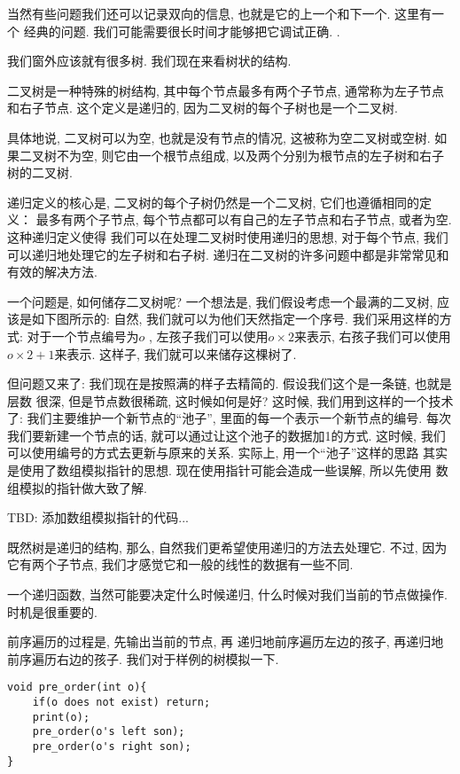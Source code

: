 
 当然有些问题我们还可以记录双向的信息, 也就是它的上一个和下一个. 这里有一个
经典的问题. 我们可能需要很长时间才能够把它调试正确. .


我们窗外应该就有很多树. 我们现在来看树状的结构. 

二叉树是一种特殊的树结构, 其中每个节点最多有两个子节点, 通常称为左子节点和右子节点. 
这个定义是递归的, 因为二叉树的每个子树也是一个二叉树. 

具体地说, 二叉树可以为空, 也就是没有节点的情况, 这被称为空二叉树或空树. 
如果二叉树不为空, 则它由一个根节点组成, 以及两个分别为根节点的左子树和右子树的二叉树. 

递归定义的核心是, 二叉树的每个子树仍然是一个二叉树, 它们也遵循相同的定义：
最多有两个子节点, 每个节点都可以有自己的左子节点和右子节点, 或者为空. 这种递归定义使得
我们可以在处理二叉树时使用递归的思想, 对于每个节点, 
我们可以递归地处理它的左子树和右子树. 递归在二叉树的许多问题中都是非常常见和有效的解决方法. 

一个问题是, 如何储存二叉树呢? 一个想法是, 我们假设考虑一个最满的二叉树, 应该是如下图所示的: 
自然, 我们就可以为他们天然指定一个序号. 我们采用这样的方式: 对于一个节点编号为$o$
, 左孩子我们可以使用$o\times 2$来表示, 右孩子我们可以使用$o\times 2+1$来表示. 
这样子, 我们就可以来储存这棵树了. 

但问题又来了: 我们现在是按照满的样子去精简的. 假设我们这个是一条链, 也就是层数
很深, 但是节点数很稀疏, 这时候如何是好? 这时候, 我们用到这样的一个技术了:
我们主要维护一个新节点的``池子'', 里面的每一个表示一个新节点的编号.
每次我们要新建一个节点的话, 就可以通过让这个池子的数据加1的方式. 这时候, 我们 
可以使用编号的方式去更新与原来的关系. 实际上, 用一个``池子''这样的思路
其实是使用了数组模拟指针的思想. 现在使用指针可能会造成一些误解, 所以先使用
数组模拟的指针做大致了解. 

TBD: 添加数组模拟指针的代码...

既然树是递归的结构, 那么, 自然我们更希望使用递归的方法去处理它. 不过, 
因为它有两个子节点, 我们才感觉它和一般的线性的数据有一些不同. 

一个递归函数, 当然可能要决定什么时候递归, 什么时候对我们当前的节点做操作. 
时机是很重要的. 

 前序遍历的过程是, 先输出当前的节点, 再
递归地前序遍历左边的孩子, 再递归地前序遍历右边的孩子. 我们对于样例的树模拟一下. 
\begin{lstlisting}
void pre_order(int o){
    if(o does not exist) return;
    print(o);
    pre_order(o's left son);
    pre_order(o's right son);
}
\end{lstlisting}

